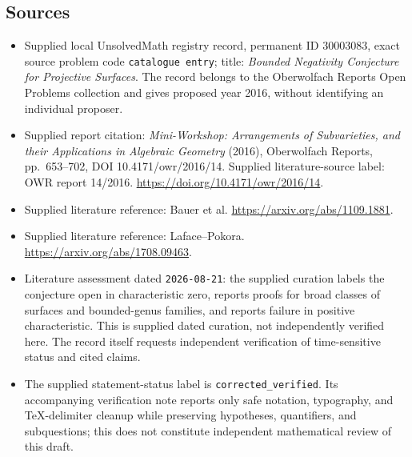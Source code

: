 \documentclass[11pt]{article}
\begin{document}
\subsection{Sources}
\begin{itemize}
\item Supplied local UnsolvedMath registry record, permanent ID \(30003083\), exact source problem code \texttt{catalogue entry}; title: \emph{Bounded Negativity Conjecture for Projective Surfaces}. The record belongs to the Oberwolfach Reports Open Problems collection and gives proposed year 2016, without identifying an individual proposer.
\item Supplied report citation: \emph{Mini-Workshop: Arrangements of Subvarieties, and their Applications in Algebraic Geometry} (2016), Oberwolfach Reports, pp.~653--702, DOI 10.4171/owr/2016/14. Supplied literature-source label: OWR report 14/2016. \url{https://doi.org/10.4171/owr/2016/14}.
\item Supplied literature reference: Bauer et al. \url{https://arxiv.org/abs/1109.1881}.
\item Supplied literature reference: Laface--Pokora. \url{https://arxiv.org/abs/1708.09463}.
\item Literature assessment dated \texttt{2026-08-21}: the supplied curation labels the conjecture open in characteristic zero, reports proofs for broad classes of surfaces and bounded-genus families, and reports failure in positive characteristic. This is supplied dated curation, not independently verified here. The record itself requests independent verification of time-sensitive status and cited claims.
\item The supplied statement-status label is \texttt{corrected\_verified}. Its accompanying verification note reports only safe notation, typography, and TeX-delimiter cleanup while preserving hypotheses, quantifiers, and subquestions; this does not constitute independent mathematical review of this draft.
\end{itemize}
\end{document}
